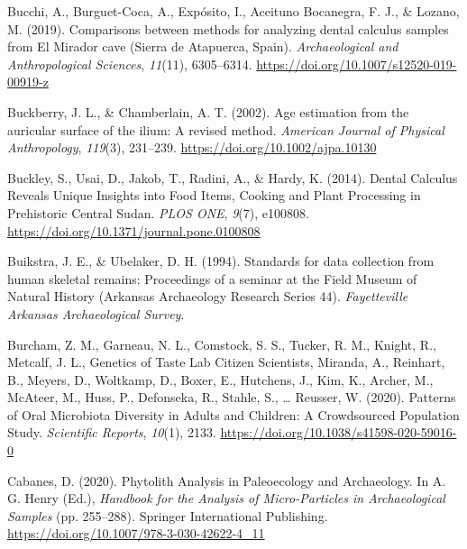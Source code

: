 \documentclass[
  letterpaper,
]{book}
\newlength{\cslhangindent}
\newlength{\cslentryspacingunit} %
\newenvironment{CSLReferences}[2] %
 {%
  \setlength{\parindent}{0pt}
  \ifodd #1
  \let\oldpar\par
  \def\par{\hangindent=\cslhangindent\oldpar}
  \fi
  \setlength{\parskip}{#2\cslentryspacingunit}
 }%
 {}
\begin{document}
\begin{CSLReferences}{1}{0}
\leavevmode{}%
Bucchi, A., Burguet-Coca, A., Expósito, I., Aceituno Bocanegra, F. J.,
\& Lozano, M. (2019). Comparisons between methods for analyzing dental
calculus samples from {El Mirador} cave ({Sierra} de {Atapuerca},
{Spain}). \emph{Archaeological and Anthropological Sciences},
\emph{11}(11), 6305--6314.
\url{https://doi.org/10.1007/s12520-019-00919-z}

\leavevmode{}%
Buckberry, J. L., \& Chamberlain, A. T. (2002). Age estimation from the
auricular surface of the ilium: A revised method. \emph{American Journal
of Physical Anthropology}, \emph{119}(3), 231--239.
\url{https://doi.org/10.1002/ajpa.10130}

\leavevmode{}%
Buckley, S., Usai, D., Jakob, T., Radini, A., \& Hardy, K. (2014).
Dental {Calculus Reveals Unique Insights} into {Food Items}, {Cooking}
and {Plant Processing} in {Prehistoric Central Sudan}. \emph{PLOS ONE},
\emph{9}(7), e100808. \url{https://doi.org/10.1371/journal.pone.0100808}

\leavevmode{}%
Buikstra, J. E., \& Ubelaker, D. H. (1994). Standards for data
collection from human skeletal remains: {Proceedings} of a seminar at
the {Field Museum} of {Natural History} ({Arkansas Archaeology Research
Series} 44). \emph{Fayetteville Arkansas Archaeological Survey}.

\leavevmode{}%
Burcham, Z. M., Garneau, N. L., Comstock, S. S., Tucker, R. M., Knight,
R., Metcalf, J. L., Genetics of Taste Lab Citizen Scientists, Miranda,
A., Reinhart, B., Meyers, D., Woltkamp, D., Boxer, E., Hutchens, J.,
Kim, K., Archer, M., McAteer, M., Huss, P., Defonseka, R., Stahle, S.,
\ldots{} Reusser, W. (2020). Patterns of {Oral Microbiota Diversity} in
{Adults} and {Children}: {A Crowdsourced Population Study}.
\emph{Scientific Reports}, \emph{10}(1), 2133.
\url{https://doi.org/10.1038/s41598-020-59016-0}

\leavevmode{}%
Cabanes, D. (2020). Phytolith {Analysis} in {Paleoecology} and
{Archaeology}. In A. G. Henry (Ed.), \emph{Handbook for the {Analysis}
of {Micro-Particles} in {Archaeological Samples}} (pp. 255--288).
{Springer International Publishing}.
\url{https://doi.org/10.1007/978-3-030-42622-4_11}


\end{CSLReferences}
\end{document}
